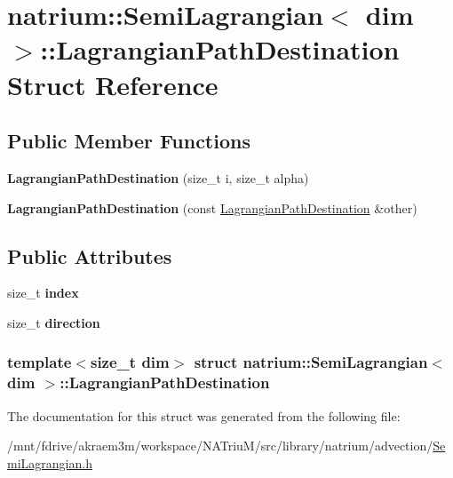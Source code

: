\hypertarget{structnatrium_1_1SemiLagrangian_1_1LagrangianPathDestination}{
\section{natrium::SemiLagrangian$<$ dim $>$::LagrangianPathDestination Struct Reference}
\label{structnatrium_1_1SemiLagrangian_1_1LagrangianPathDestination}
}
\subsection*{Public Member Functions}
\begin{DoxyCompactItemize}
\item 
\hypertarget{structnatrium_1_1SemiLagrangian_1_1LagrangianPathDestination_ac42d41c802af20f0f7d3448b6ac1362c}{
{\bfseries LagrangianPathDestination} (size\_\-t i, size\_\-t alpha)}
\label{structnatrium_1_1SemiLagrangian_1_1LagrangianPathDestination_ac42d41c802af20f0f7d3448b6ac1362c}

\item 
\hypertarget{structnatrium_1_1SemiLagrangian_1_1LagrangianPathDestination_a4162916c7313a9ec120c5ed740497549}{
{\bfseries LagrangianPathDestination} (const \hyperlink{structnatrium_1_1SemiLagrangian_1_1LagrangianPathDestination}{LagrangianPathDestination} \&other)}
\label{structnatrium_1_1SemiLagrangian_1_1LagrangianPathDestination_a4162916c7313a9ec120c5ed740497549}

\end{DoxyCompactItemize}
\subsection*{Public Attributes}
\begin{DoxyCompactItemize}
\item 
\hypertarget{structnatrium_1_1SemiLagrangian_1_1LagrangianPathDestination_ac9503f7db5a371960e727b0ec8bf8a60}{
size\_\-t {\bfseries index}}
\label{structnatrium_1_1SemiLagrangian_1_1LagrangianPathDestination_ac9503f7db5a371960e727b0ec8bf8a60}

\item 
\hypertarget{structnatrium_1_1SemiLagrangian_1_1LagrangianPathDestination_a32659a22320f66a63753a3a86a416b4a}{
size\_\-t {\bfseries direction}}
\label{structnatrium_1_1SemiLagrangian_1_1LagrangianPathDestination_a32659a22320f66a63753a3a86a416b4a}

\end{DoxyCompactItemize}
\subsubsection*{template$<$size\_\-t dim$>$ struct natrium::SemiLagrangian$<$ dim $>$::LagrangianPathDestination}



The documentation for this struct was generated from the following file:\begin{DoxyCompactItemize}
\item 
/mnt/fdrive/akraem3m/workspace/NATriuM/src/library/natrium/advection/\hyperlink{SemiLagrangian_8h}{SemiLagrangian.h}\end{DoxyCompactItemize}
